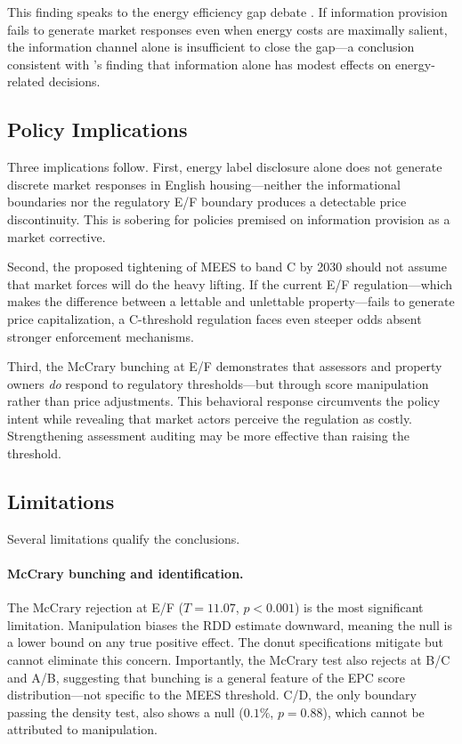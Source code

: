 \documentclass[12pt]{article}
\begin{document}
This finding speaks to the energy efficiency gap debate \citep{allcott2014consumers, gerarden2017assessing}. If information provision fails to generate market responses even when energy costs are maximally salient, the information channel alone is insufficient to close the gap---a conclusion consistent with \citet{allcott2014consumers}'s finding that information alone has modest effects on energy-related decisions.

\subsection{Policy Implications}

Three implications follow. First, energy label disclosure alone does not generate discrete market responses in English housing---neither the informational boundaries nor the regulatory E/F boundary produces a detectable price discontinuity. This is sobering for policies premised on information provision as a market corrective.

Second, the proposed tightening of MEES to band C by 2030 should not assume that market forces will do the heavy lifting. If the current E/F regulation---which makes the difference between a lettable and unlettable property---fails to generate price capitalization, a C-threshold regulation faces even steeper odds absent stronger enforcement mechanisms.

Third, the McCrary bunching at E/F demonstrates that assessors and property owners \textit{do} respond to regulatory thresholds---but through score manipulation rather than price adjustments. This behavioral response circumvents the policy intent while revealing that market actors perceive the regulation as costly. Strengthening assessment auditing may be more effective than raising the threshold.

\subsection{Limitations}

Several limitations qualify the conclusions.

\paragraph{McCrary bunching and identification.} The McCrary rejection at E/F ($T = 11.07$, $p < 0.001$) is the most significant limitation. Manipulation biases the RDD estimate downward, meaning the null is a lower bound on any true positive effect. The donut specifications mitigate but cannot eliminate this concern. Importantly, the McCrary test also rejects at B/C and A/B, suggesting that bunching is a general feature of the EPC score distribution---not specific to the MEES threshold. C/D, the only boundary passing the density test, also shows a null ($0.1\%$, $p = 0.88$), which cannot be attributed to manipulation.
\end{document}
